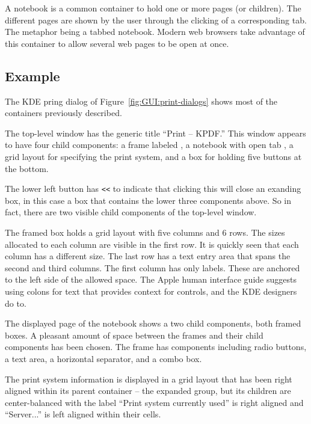 A notebook is a common container to hold one or more pages (or
children). The different pages are shown by the user through the
clicking of a corresponding tab. The metaphor being a tabbed
notebook. Modern web browsers take advantage of this container to
allow several web pages to be open at once.




\subsection{Example}

The KDE pring dialog of Figure~\ref{fig:GUI:print-dialogs} shows
most of the containers previously described. 

The top-level window has the generic title ``Print -- KPDF.'' This
window appears to have four child components: a frame labeled
, a notebook with open tab , a
grid layout for specifying the print system, and a box for holding
five buttons at the bottom. 

The lower left  button has \verb+<<+ to
indicate that clicking this will close an exanding box, in this case a
box that contains the lower three components above. So in fact, there
are two visible child components of the top-level window.

The framed box holds a grid layout with five columns and 6 rows. The
sizes allocated to each column are visible in the first row. It is
quickly seen that each column has a different size. The last row has a
text entry area that spans the second and third columns. The first
column has only labels. These are anchored to the left side of the
allowed space. The Apple human interface guide
\citep[p. 124]{APPLE:HIG} suggests using colons for text that provides
context for controls, and the KDE designers do to. 

The displayed page of the notebook shows a two child components, both
framed boxes. A pleasant amount of space between the frames and their
child components has been chosen. The  frame has
components including radio buttons, a text area, a horizontal
separator, and a combo box.

The print system information is displayed in a grid layout that has
been right aligned within its parent container -- the expanded group,
but its children are center-balanced with the label ``Print system
currently used'' is right aligned and ``Server...'' is left aligned
within their cells.

